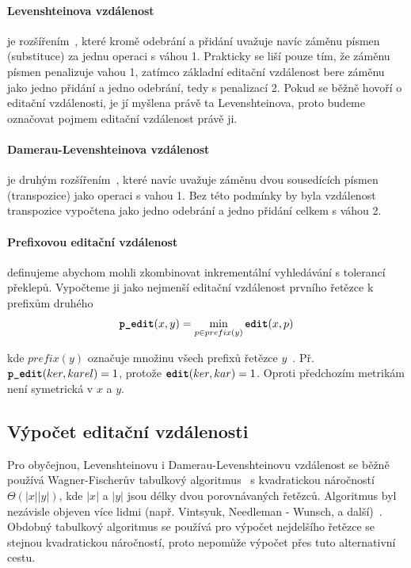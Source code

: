 \documentclass[11pt,letterpaper,oneside,openright]{book}
\newcommand{\bftt}[1]{\texttt{\textbf{#1}}}
\begin{document}
\paragraph{Levenshteinova vzdálenost} je rozšířením~\cite{Levenshtein66}, které
kromě odebrání a přidání uvažuje navíc záměnu písmen (substituce) za jednu
operaci s váhou 1.  Prakticky se liší pouze tím, že záměnu písmen penalizuje
vahou 1, zatímco základní editační vzdálenost bere záměnu jako jedno přidání a
jedno odebrání, tedy s penalizací 2. Pokud se běžně hovoří o editační
vzdálenosti, je jí myšlena právě ta Levenshteinova, proto budeme označovat
pojmem editační vzdálenost právě ji.

\paragraph{Damerau-Levenshteinova vzdálenost} je druhým
rozšířením~\cite{Damerau:1964:TCD:363958.363994}, které navíc uvažuje záměnu
dvou sousedících písmen (transpozice) jako operaci s vahou 1. Bez této podmínky
by byla vzdálenost transpozice vypočtena jako jedno odebrání a jedno přidání
celkem s váhou 2.

\paragraph{Prefixovou editační vzdálenost} definujeme abychom mohli zkombinovat
inkrementální vyhledávání s tolerancí překlepů. Vypočteme ji jako nejmenší
editační vzdálenost prvního řetězce k prefixům druhého \[\bftt{p\_edit}(x, y) =
\min_{p \in prefix(y)} \bftt{edit}(x, p)\]

kde $prefix(y)$ označuje množinu všech prefixů řetězce
$y$~\cite{Bast:2013:EFS:2457465.2457470}. Př.  $\bftt{p\_edit}(ker, karel) =
1$, protože $\bftt{edit}(ker, kar) = 1$. Oproti předchozím metrikám není
symetrická v $x$ a $y$.


\subsection{Výpočet editační vzdálenosti}
Pro obyčejnou, Levenshteinovu i Damerau-Levenshteinovu vzdálenost se běžně
používá Wagner-Fischerův tabulkový
algoritmus~\cite{Wagner:1974:SCP:321796.321811} s kvadratickou náročností
$\Theta(|x||y|)$, kde $|x|$ a $|y|$ jsou délky dvou porovnávaných řetězců.
Algoritmus byl nezávisle objeven více lidmi (např.  Vintsyuk, Needleman -
Wunsch, a další)~\cite{Navarro:2001:GTA:375360.375365}.  Obdobný tabulkový
algoritmus se používá pro výpočet nejdelšího řetězce se stejnou kvadratickou
náročností, proto nepomůže výpočet přes tuto alternativní cestu.
\end{document}
